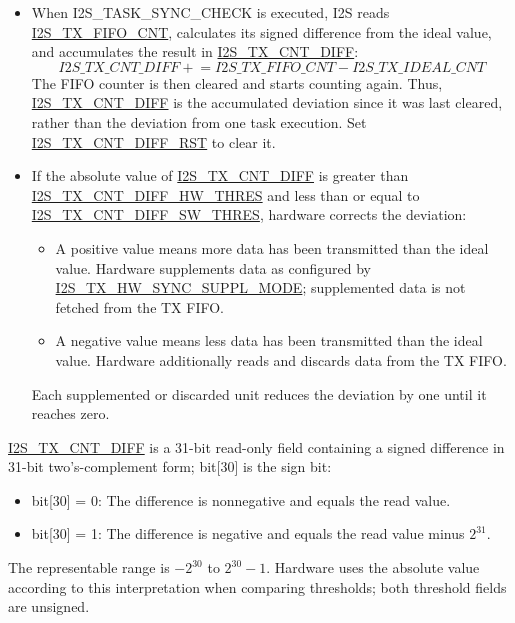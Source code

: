 \documentclass[main\_\_EN.tex]{subfiles}
\begin{document}
\begin{itemize}
    \item When I2S\_TASK\_SYNC\_CHECK is executed, I2S reads \hyperref[fielddesc:I2STXFIFOCNT]{I2S\_TX\_FIFO\_CNT}, calculates its signed difference from the ideal value, and accumulates the result in \hyperref[fielddesc:I2STXCNTDIFF]{I2S\_TX\_CNT\_DIFF}:
    \[
        \hyperref[fielddesc:I2STXCNTDIFF]{I2S\_TX\_CNT\_DIFF} \mathrel{+}= \hyperref[fielddesc:I2STXFIFOCNT]{I2S\_TX\_FIFO\_CNT} - \hyperref[fielddesc:I2STXIDEALCNT]{I2S\_TX\_IDEAL\_CNT}
    \]
    The FIFO counter is then cleared and starts counting again. Thus, \hyperref[fielddesc:I2STXCNTDIFF]{I2S\_TX\_CNT\_DIFF} is the accumulated deviation since it was last cleared, rather than the deviation from one task execution. Set \hyperref[fielddesc:I2STXCNTDIFFRST]{I2S\_TX\_CNT\_DIFF\_RST} to clear it.
    \item If the absolute value of \hyperref[fielddesc:I2STXCNTDIFF]{I2S\_TX\_CNT\_DIFF} is greater than \hyperref[fielddesc:I2STXCNTDIFFHWTHRES]{I2S\_TX\_CNT\_DIFF\_HW\_THRES} and less than or equal to \hyperref[fielddesc:I2STXCNTDIFFSWTHRES]{I2S\_TX\_CNT\_DIFF\_SW\_THRES}, hardware corrects the deviation:
    \begin{itemize}
        \item A positive value means more data has been transmitted than the ideal value. Hardware supplements data as configured by \hyperref[fielddesc:I2STXHWSYNCSUPPLMODE]{I2S\_TX\_HW\_SYNC\_SUPPL\_MODE}; supplemented data is not fetched from the TX FIFO.
        \item A negative value means less data has been transmitted than the ideal value. Hardware additionally reads and discards data from the TX FIFO.
    \end{itemize}
    Each supplemented or discarded unit reduces the deviation by one until it reaches zero.
\end{itemize}

\begin{tiplisting}
\hyperref[fielddesc:I2STXCNTDIFF]{I2S\_TX\_CNT\_DIFF} is a 31-bit read-only field containing a signed difference in 31-bit two's-complement form; bit[30] is the sign bit:
\begin{itemize}
    \item bit[30] = 0: The difference is nonnegative and equals the read value.
    \item bit[30] = 1: The difference is negative and equals the read value minus $2^{31}$.
\end{itemize}
The representable range is $-2^{30}$ to $2^{30}-1$. Hardware uses the absolute value according to this interpretation when comparing thresholds; both threshold fields are unsigned.
\end{tiplisting}
\end{document}
